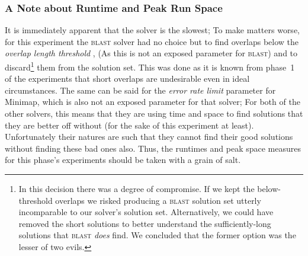 \subsubsection{A Note about Runtime and Peak Run Space}
\label{note:runtime_runspace}

It is immediately apparent that the \aspop{} solver is the slowest; To make matters worse, for this experiment the \textsc{blast} solver had no choice but to find overlaps below the \textit{overlap length threshold} , (As this is not an exposed parameter for \textsc{blast}) and to discard\footnote{In this decision there was a degree of compromise. If we kept the below-threshold overlaps we risked producing a \textsc{blast} solution set utterly incomparable to our \aspop{} solver's solution set. Alternatively, we could have removed the short solutions to better understand the sufficiently-long solutions that \textsc{blast} \textit{does} find. We concluded that the former option was the lesser of two evils.} them from the solution set. This was done as it is known from phase~1 of the experiments that short overlaps are undesirable even in ideal circumstances. The same can be said for the \textit{error rate limit} parameter  for Minimap, which is also not an exposed parameter for that solver; For both of the other solvers, this means that they are using time and space to find solutions that they are better off without (for the sake of this experiment at least). Unfortunately their natures are such that they cannot find their good solutions without finding these bad ones also. Thus, the runtimes and peak space measures for this phase's experiments should be taken with a grain of salt.

\FloatBarrier

